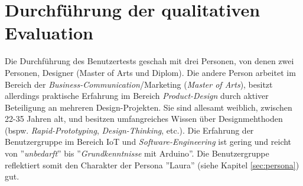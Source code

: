 \section{Durchführung der qualitativen Evaluation}

Die Durchführung des Benutzertests geschah mit drei Personen, von denen zwei Personen, Designer (Master of Arts und Diplom). Die andere Person arbeitet im Bereich der \textit{Business-Communication}/Marketing (\textit{Master of Arts}), besitzt allerdings praktische Erfahrung im Bereich \textit{Product-Design} durch aktiver Beteiligung an mehreren Design-Projekten. Sie sind allesamt weiblich, zwischen 22-35 Jahren alt, und besitzen umfangreiches Wissen über Designmehthoden (bspw. \textit{Rapid-Prototyping}, \textit{Design-Thinking}, etc.). Die Erfahrung der Benutzergruppe im Bereich \ac{IoT} und \textit{Soft\-ware-Engineering} ist gering und reicht von ''\textit{unbedarft}'' bis ''\textit{Grundkenntnisse} mit Arduino''. Die Benutzergruppe reflektiert somit den Charakter der Persona ''Laura'' (siehe Kapitel \ref{sec:persona}) gut.

